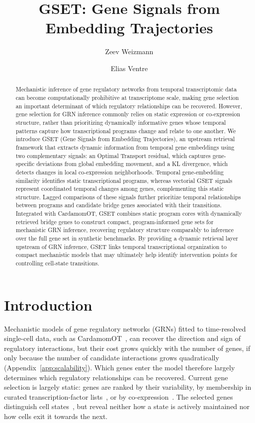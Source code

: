 \documentclass[10pt, letterpaper]{article}
\title{GSET: Gene Signals from Embedding Trajectories}
\author{Zeev Weizmann \and Elias Ventre}
\date{}
\DeclareRobustCommand{\eliasadds}[1]{{\color{red}#1}}
\begin{document}
\maketitle
\vspace{-2em}

\begin{abstract}
\noindent Mechanistic inference of gene regulatory networks from temporal transcriptomic data can become computationally prohibitive at transcriptome scale, making gene selection an important determinant of which regulatory relationships can be recovered. However, gene selection for GRN inference commonly relies on static expression or co-expression structure, rather than prioritizing dynamically informative genes whose temporal patterns capture how transcriptional programs change and relate to one another.\eliasadds{ }We introduce GSET (Gene Signals from Embedding Trajectories), an upstream retrieval framework that extracts dynamic information from temporal gene embeddings using two complementary signals: an Optimal Transport residual, which captures gene-specific deviations from global embedding movement, and a KL divergence, which detects changes in local co-expression neighborhoods. Temporal gene-embedding similarity identifies static transcriptional programs, whereas vectorial GSET signals represent coordinated temporal changes among genes, complementing this static structure. Lagged comparisons of these signals further prioritize temporal relationships between programs and candidate bridge genes associated with their transitions. Integrated with CardamomOT, GSET combines static program cores with dynamically retrieved bridge genes to construct compact, program-informed gene sets for mechanistic GRN inference, recovering regulatory structure comparably to inference over the full gene set in synthetic benchmarks. By providing a dynamic retrieval layer upstream of GRN inference, GSET links temporal transcriptional organization to compact mechanistic models that may ultimately help identify intervention points for controlling cell-state transitions.
\end{abstract}



\section{Introduction}
\label{sec:intro}

Mechanistic models of gene regulatory networks (GRNs) fitted to time-resolved single-cell data, such as CardamomOT~\cite{ventre2026cardamomot}, can recover the direction and sign of regulatory interactions, but their cost grows quickly with the number of genes, if only because the number of candidate interactions grows quadratically (Appendix~\ref{app:scalability}). Which genes enter the model therefore largely determines which regulatory relationships can be recovered. Current gene selection is largely static: genes are ranked by their variability, by membership in curated transcription-factor lists~\cite{pratapa2020beeline}, or by co-expression~\cite{langfelder2008wgcna}. The selected genes distinguish cell states~\cite{ranek2024delve}, but reveal neither how a state is actively maintained nor how cells exit it towards the next.
\end{document}
